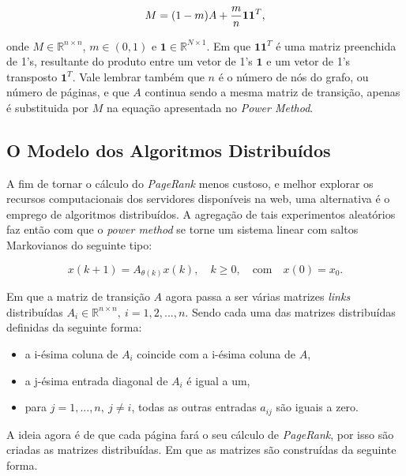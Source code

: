 \documentclass[a4paper]{report} %
\begin{document}
\begin{equation}
M = (1-m)A + \frac{m}{n}{\bf11}^T,
\end{equation}

\noindent onde $M \in \mathbb{R}^{n \times n}$, $m \in (0,1)$ e $\textbf{1} \in \mathbb{R}^{N \times 1}$. Em que $\textbf{11}^T$ é uma matriz preenchida de 1's, resultante do produto entre um vetor de 1's $\textbf{1}$ e um vetor de 1's transposto $\textbf{1}^T$. Vale lembrar também que $n$ é o número de nós do grafo, ou número de páginas, e que $A$ continua sendo a mesma matriz de transição, apenas é substituida por $M$ na equação apresentada no \textit{Power Method}.


\subsection*{O Modelo dos Algoritmos Distribu\'idos}

A fim de tornar o cálculo do \textit{PageRank} menos custoso, e melhor explorar os recursos computacionais dos servidores disponíveis na web, uma alternativa é o emprego de algoritmos distribuídos. A agregação de tais experimentos aleatórios faz então com que o \textit{power method} se torne um sistema linear com saltos Markovianos do seguinte tipo:

\begin{equation}
	x(k+1) = A_{\theta(k)}x(k), \quad k\geq0, \quad \text{com} \quad x(0) = x_0. 
\end{equation}

Em que a matriz de transição $A$ agora passa a ser várias matrizes \textit{links} distribu\'idas $A_i \in \mathbb{R}^{n \times n}, \: i = 1,2, ..., n$. Sendo cada uma das matrizes distribuídas definidas da seguinte forma: 

\begin{itemize}
\item a i-ésima coluna de $A_i$ coincide com a i-ésima coluna de $A$,
\item a j-ésima entrada diagonal de $A_i$ é igual a um,
\item para $j = 1, ..., n, \: j \neq i$, todas as outras entradas $a_{ij}$ são iguais a zero.
\end{itemize}

A ideia agora é de que cada página fará o seu cálculo de \textit{PageRank}, por isso são criadas as matrizes  distribuídas. Em que as matrizes são construídas da seguinte forma.
\end{document}
